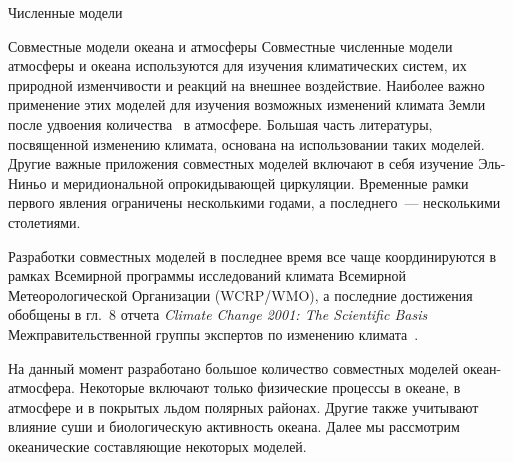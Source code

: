 \begin{chapter}{Численные модели}
\begin{section}{Совместные модели океана и атмосферы}\label{sec:CoupledModels}
Совместные численные модели атмосферы и океана используются для изучения
климатических систем, их природной изменчивости и реакций на внешнее
воздействие. Наиболее важно применение этих моделей для изучения возможных
изменений климата Земли после удвоения количества~\COtwo{} в атмосфере. 
Большая часть литературы, посвященной изменению климата, основана на
использовании таких моделей. Другие важные приложения совместных моделей
включают в себя изучение Эль-Ниньо и меридиональной опрокидывающей 
циркуляции. 
Временные рамки первого явления ограничены несколькими годами, 
а последнего~--- несколькими столетиями.
%

Разработки совместных моделей в последнее время все чаще координируются
в рамках Всемирной программы исследований климата Всемирной Метеорологической
Организации (WCRP/WMO), а последние достижения обобщены в гл.~8
отчета \textit{Climate Change 2001: The Scientific Basis} 
Межправительственной группы экспертов по изменению климата~\cite{IPCC:2007}.
%

На данный момент разработано большое количество совместных моделей 
океан-атмосфера. 
Некоторые включают только физические процессы в
океане, в атмосфере и в покрытых льдом полярных районах. Другие
также учитывают влияние суши и биологическую активность океана.
Далее мы рассмотрим океанические составляющие некоторых моделей.
%


\end{section}
\end{chapter}
